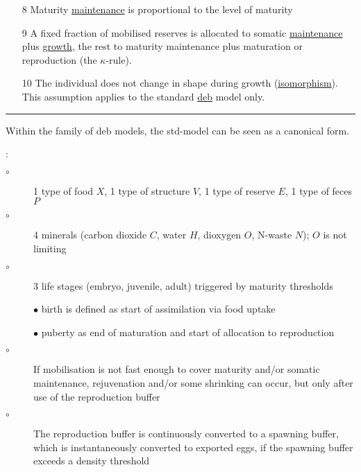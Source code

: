 \begin{table}[tb]
\begin{itemize}
\item[8] Maturity \hyperref[glos:maintenance]{maintenance} is proportional to the level of maturity

\item[9] A fixed fraction of mobilised reserves is allocated to somatic \hyperref[glos:maintenance]{maintenance} plus \hyperref[glos:growth]{growth}, the rest to maturity maintenance plus maturation or reproduction (the $\kappa$-rule).
  
\item[10] The individual does not change in shape during growth (\hyperref[glos:isomorph]{isomorphism}).
  This assumption applies to the standard \hyperref[glos:DEB]{\sc deb} model only.

\end{itemize}
  \rule{16cm}{.1mm}
\end{table}


Within the family of {\sc deb} models, the std-model can be seen as a canonical form.

\vspace{5mm}: {\small
\begin{description}
  \item[$\circ$] 1 type of food $X$, 1 type of structure $V$, 1 type of reserve $E$, 1 type of feces $P$ 
	
	\item[$\circ$] 4 minerals (carbon dioxide $C$, water $H$, dioxygen $O$, N-waste $N$); $O$ is not limiting 
	
  \item[$\circ$] 3 life stages (embryo, juvenile, adult) triggered by maturity thresholds
	
	  \subitem $\bullet$ birth is defined as start of assimilation via food uptake 
		
		\subitem $\bullet$ puberty as end of maturation and start of allocation to reproduction
		
	\item[$\circ$] If mobilisation is not fast enough to cover maturity and/or somatic maintenance,
	  rejuvenation and/or some shrinking can occur, but only after use of the reproduction buffer
		
	\item[$\circ$] The reproduction buffer is continuously converted to a spawning buffer, which is instantaneously converted to exported eggs,
	  if the spawning buffer exceeds a density threshold
\end{description}}

